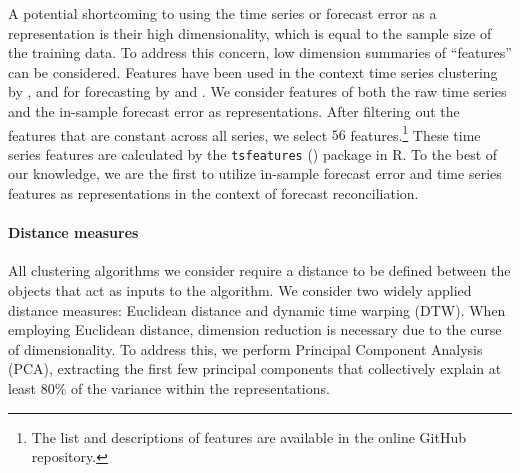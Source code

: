 \documentclass[a4paper,review,12pt,authoryear]{elsarticle}
\let\code=\texttt
\begin{document}
A potential shortcoming to using the time series or forecast error as a representation is their high dimensionality, which is equal to the sample size of the training data. To address this concern, low dimension summaries of ``features'' can be considered. Features have been used in the context
time series clustering by \cite{tianoFeatTSFeaturebasedTime2021}, and for forecasting by \cite{wangUncertaintyEstimationFeaturebased2022} and \cite{ liFeaturebasedIntermittentDemand2023}. 
We consider features of both the raw time series and the in-sample forecast error as representations. After filtering out the features that are constant across all series, we select $56$ features.\footnote{The list and descriptions of features are available in the online GitHub repository.} These time series features are calculated by the \code{tsfeatures} (\citealp{tsfeatures}) package in R. %
To the best of our knowledge, we are the first to utilize in-sample forecast error and time series features as representations in the context of forecast reconciliation.

\paragraph{\textbf{Distance measures}}

All clustering algorithms we consider require a distance to be defined between the objects that act as inputs to the algorithm.
We consider two widely applied distance measures: Euclidean distance and dynamic time warping (DTW). When employing Euclidean distance, dimension reduction is necessary due to the curse of dimensionality. %
To address this, we perform Principal Component Analysis (PCA), extracting the first few principal components that collectively explain at least 80\% of the variance within the representations.
\end{document}
